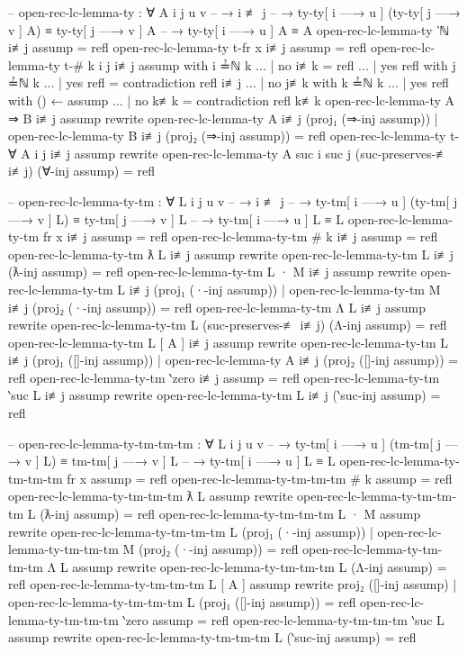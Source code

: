 \documentclass[logo,bsc,singlespacing,parskip,online]{infthesis}
\renewenvironment{code}{\mintedcopy[breaklines,breaksymbolleft=\;]{agda}}{\endmintedcopy}
\begin{document}
\begin{code}
  -- open-rec-lc-lemma-ty : ∀ {A i j u v}
  --   → i ≢ j
  --   → ty-ty[ i —→ u ] (ty-ty[ j —→ v ] A) ≡ ty-ty[ j —→ v ] A
  --   → ty-ty[ i —→ u ] A ≡ A
  open-rec-lc-lemma-ty {‵ℕ} i≢j assump = refl
  open-rec-lc-lemma-ty {t-fr x} i≢j assump = refl
  open-rec-lc-lemma-ty {t-# k} {i} {j} i≢j assump with i ≟ℕ k
  ... | no  i≢k  = refl
  ... | yes refl with j ≟ℕ k
  ...   | yes refl = contradiction refl i≢j
  ...   | no  j≢k with k ≟ℕ k
  ...     | yes refl with () ← assump
  ...     | no  k≢k = contradiction refl k≢k
  open-rec-lc-lemma-ty {A ⇒ B} i≢j assump rewrite
      open-rec-lc-lemma-ty {A} i≢j (proj₁ (⇒-inj assump))
    | open-rec-lc-lemma-ty {B} i≢j (proj₂ (⇒-inj assump))
    = refl
  open-rec-lc-lemma-ty {t-∀ A} {i} {j} i≢j assump
    rewrite open-rec-lc-lemma-ty {A} {suc i} {suc j}
      (suc-preserves-≢ i≢j)
      (∀-inj assump)
        = refl

  -- open-rec-lc-lemma-ty-tm : ∀ {L i j u v}
  --   → i ≢ j
  --   → ty-tm[ i —→ u ] (ty-tm[ j —→ v ] L) ≡ ty-tm[ j —→ v ] L
  --   → ty-tm[ i —→ u ] L ≡ L
  open-rec-lc-lemma-ty-tm {fr x} i≢j assump = refl
  open-rec-lc-lemma-ty-tm {# k} i≢j assump = refl
  open-rec-lc-lemma-ty-tm {ƛ L} i≢j assump rewrite
    open-rec-lc-lemma-ty-tm {L} i≢j (ƛ-inj assump) = refl
  open-rec-lc-lemma-ty-tm {L · M} i≢j assump rewrite
      open-rec-lc-lemma-ty-tm {L} i≢j (proj₁ (·-inj assump))
    | open-rec-lc-lemma-ty-tm {M} i≢j (proj₂ (·-inj assump)) = refl
  open-rec-lc-lemma-ty-tm {Λ L} i≢j assump rewrite
    open-rec-lc-lemma-ty-tm {L} (suc-preserves-≢ i≢j) (Λ-inj assump) = refl
  open-rec-lc-lemma-ty-tm {L [ A ]} i≢j assump rewrite
      open-rec-lc-lemma-ty-tm {L} i≢j (proj₁ ([]-inj assump))
    | open-rec-lc-lemma-ty {A} i≢j (proj₂ ([]-inj assump)) = refl
  open-rec-lc-lemma-ty-tm {‵zero} i≢j assump = refl
  open-rec-lc-lemma-ty-tm {‵suc L} i≢j assump rewrite
    open-rec-lc-lemma-ty-tm {L} i≢j (‵suc-inj assump) = refl

  -- open-rec-lc-lemma-ty-tm-tm-tm : ∀ {L i j u v}
  --   → ty-tm[ i —→ u ] (tm-tm[ j —→ v ] L) ≡ tm-tm[ j —→ v ] L
  --   → ty-tm[ i —→ u ] L ≡ L
  open-rec-lc-lemma-ty-tm-tm-tm {fr x} assump = refl
  open-rec-lc-lemma-ty-tm-tm-tm {# k} assump = refl
  open-rec-lc-lemma-ty-tm-tm-tm {ƛ L} assump rewrite
    open-rec-lc-lemma-ty-tm-tm-tm {L} (ƛ-inj assump) = refl
  open-rec-lc-lemma-ty-tm-tm-tm {L · M} assump rewrite
      open-rec-lc-lemma-ty-tm-tm-tm {L} (proj₁ (·-inj assump))
    | open-rec-lc-lemma-ty-tm-tm-tm {M} (proj₂ (·-inj assump))
    = refl
  open-rec-lc-lemma-ty-tm-tm-tm {Λ L} assump rewrite
    open-rec-lc-lemma-ty-tm-tm-tm {L} (Λ-inj assump) = refl
  open-rec-lc-lemma-ty-tm-tm-tm {L [ A ]} assump rewrite
      proj₂ ([]-inj assump)
    | open-rec-lc-lemma-ty-tm-tm-tm {L} (proj₁ ([]-inj assump))
    = refl
  open-rec-lc-lemma-ty-tm-tm-tm {‵zero} assump = refl
  open-rec-lc-lemma-ty-tm-tm-tm {‵suc L} assump rewrite
    open-rec-lc-lemma-ty-tm-tm-tm {L} (‵suc-inj assump) = refl
\end{code}
\end{document}
